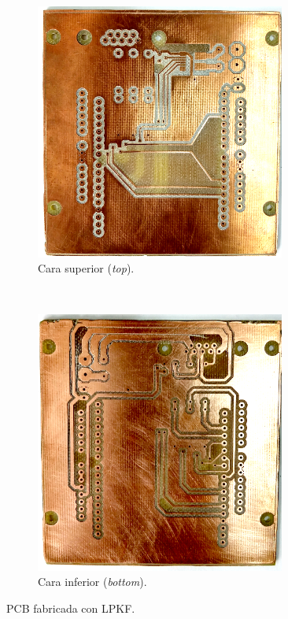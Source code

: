 \begin{figure}[H]
  \centering
  \begin{subfigure}[b]{0.35\textwidth}
    \includegraphics[width=0.9\textwidth]{img/cap4/top_pcb}
    \caption{Cara superior (\textit{top}).}
    \label{cap4_top_pcb}
  \end{subfigure}%
  ~
  \begin{subfigure}[b]{0.35\textwidth}
    \includegraphics[width=0.9\textwidth]{img/cap4/bottom_pcb}
    \caption{Cara inferior (\textit{bottom}).}
    \label{cap4_bottom_pcb}
    \end{subfigure}
  \caption{PCB fabricada con LPKF\textregistered.}
  \label{cap4_pcb}
\end{figure}

